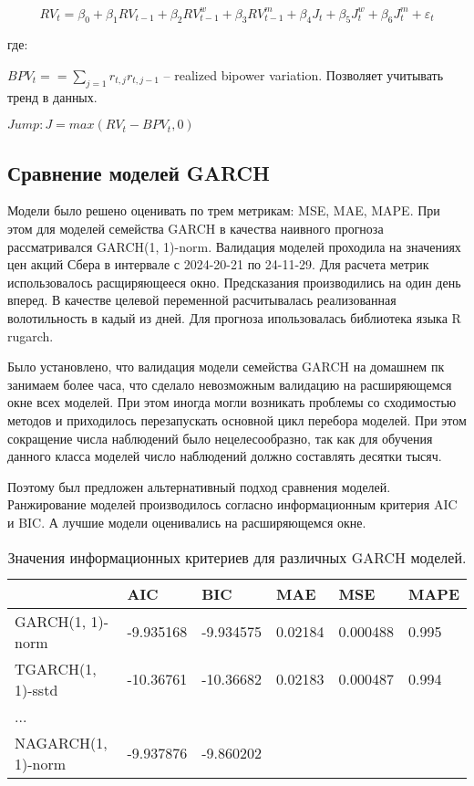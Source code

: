 \documentclass[]{article}
\begin{document}
$$RV_t = \beta_0 + \beta_1 RV_{t-1} + \beta_2 RV_{t-1}^w + \beta_3 RV_{t-1}^m + \beta_{4}J_t + \beta_5 J_t^w + \beta_6 J_t^m + \varepsilon_{t}$$

где:

$BPV_t == \sum_{j=1}r_{t, j}r_{t, j-1}$ -- realized bipower variation. Позволяет учитывать тренд в данных.

$Jump: J = max(RV_t - BPV_t, 0)$


\subsection{Сравнение моделей GARCH}


Модели было решено оценивать по трем метрикам: MSE, MAE, MAPE. При этом для моделей семейства GARCH в качества наивного прогноза рассматривался GARCH(1, 1)-norm. Валидация моделей проходила на значениях цен акций Сбера в интервале с 2024-20-21 по 24-11-29. Для расчета метрик использовалось расщиряющееся окно. Предсказания производились на один день вперед. В качестве целевой переменной расчитывалась реализованная волотильность в кадый из дней.
Для прогноза ипользовалась библиотека языка R rugarch.

Было установлено, что валидация модели семейства GARCH на домашнем пк занимаем более часа, что сделало невозможным валидацию на расширяющемся окне всех моделей. При этом иногда могли возникать проблемы со сходимостью методов и приходилось перезапускать основной цикл перебора моделей. При этом сокращение числа наблюдений было нецелесообразно, так как для обучения данного класса моделей число наблюдений должно 
составлять десятки тысяч.

Поэтому был предложен альтернативный подход сравнения моделей. Ранжирование моделей производилось согласно информационным критерия AIC и BIC. А лучшие модели оценивались на расширяющемся окне.




\begin{table}[h!]
	\centering
	\caption{Значения информационных критериев для различных GARCH моделей.}
	\begin{tabularx}{\textwidth}{|X|X|X|l|l|l|}
		\hline
		                    	& AIC        & BIC        & MAE          & MSE             & MAPE    \\ \hline
		GARCH(1, 1)-norm        & -9.935168  & -9.934575  & 0.02184 &  0.000488   & 0.995   \\ \hline
		TGARCH(1, 1)-sstd       & -10.36761  & -10.36682  &0.02183  &0.000487     &0.994   \\ \hline
		     ...    &  &   &&&    \\ \hline
		NAGARCH(1, 1)-norm      & -9.937876  & -9.860202  &&&    \\ \hline
		
		
	\end{tabularx}
	\label{tab:1}
\end{table}
\end{document}
